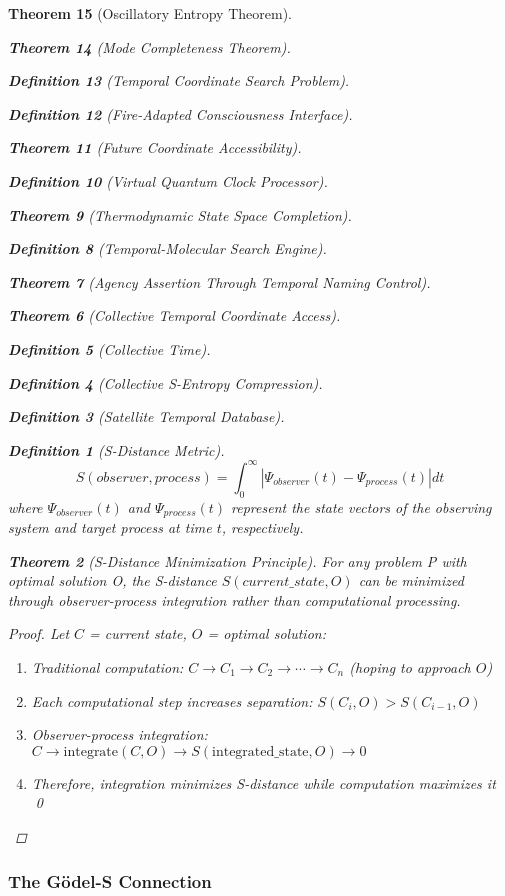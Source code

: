 \documentclass[12pt,a4paper]{article}
\newtheorem{theorem}{Theorem}[section]
\newtheorem{definition}[theorem]{Definition}
\begin{document}
\begin{theorem}[Oscillatory Entropy Theorem]
\begin{theorem}[Mode Completeness Theorem]
\begin{enumerate}
\begin{definition}[Temporal Coordinate Search Problem]
\begin{algorithm}
\begin{definition}[Fire-Adapted Consciousness Interface]
\begin{theorem}[Future Coordinate Accessibility]
\begin{definition}[Virtual Quantum Clock Processor]
\begin{itemize}
\begin{itemize}
\begin{theorem}[Thermodynamic State Space Completion]
\begin{definition}[Temporal-Molecular Search Engine]
\begin{theorem}[Agency Assertion Through Temporal Naming Control]
\begin{remark}
\begin{theorem}[Collective Temporal Coordinate Access]
\begin{definition}[Collective Time]
\begin{definition}[Collective S-Entropy Compression]
\begin{definition}[Satellite Temporal Database]
\begin{algorithm}
\begin{table}[h]
{{\begin{definition}[S-Distance Metric]
$$S(observer, process) = \int_0^{\infty} |\Psi_{observer}(t) - \Psi_{process}(t)| dt$$
where $\Psi_{observer}(t)$ and $\Psi_{process}(t)$ represent the state vectors of the observing system and target process at time $t$, respectively.
\end{definition}

\begin{theorem}[S-Distance Minimization Principle]
For any problem P with optimal solution O, the S-distance $S(current\_state, O)$ can be minimized through observer-process integration rather than computational processing.
\end{theorem}

\begin{proof}
Let $C$ = current state, $O$ = optimal solution:
\begin{enumerate}
\item Traditional computation: $C \to C_1 \to C_2 \to \cdots \to C_n$ (hoping to approach $O$)
\item Each computational step increases separation: $S(C_i, O) > S(C_{i-1}, O)$
\item Observer-process integration: $C \to \text{integrate}(C, O) \to S(\text{integrated\_state}, O) \to 0$
\item Therefore, integration minimizes S-distance while computation maximizes it \qed
\end{enumerate}
\end{proof}

\subsubsection{The Gödel-S Connection}

}}
\end{table}
\end{algorithm}
\end{definition}
\end{definition}
\end{definition}
\end{theorem}
\end{remark}
\end{theorem}
\end{definition}
\end{theorem}
\end{itemize}
\end{itemize}
\end{definition}
\end{theorem}
\end{definition}
\end{algorithm}
\end{definition}
\end{enumerate}
\end{theorem}
\end{theorem}
\end{document}

